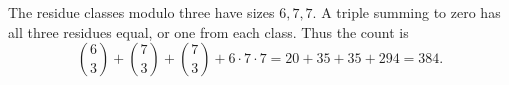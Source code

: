 The residue classes modulo three have sizes $6,7,7$. A triple summing to zero has all three residues equal, or one from each class. Thus the count is
\[\binom63+\binom73+\binom73+6\cdot7\cdot7=20+35+35+294=\boxed{384}.\]
